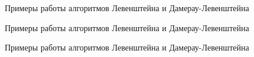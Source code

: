\documentclass[a4paper]{article}
\begin{document}
		\begin{figure}[h]
		
		\caption{Примеры работы алгоритмов Левенштейна и Дамерау-Левенштейна \centering}
		\label{image5}
	\end{figure}
	\begin{figure}[h]
		
		\caption{Примеры работы алгоритмов Левенштейна и Дамерау-Левенштейна \centering}
		\label{image6}
	\end{figure}
	
	\begin{figure}[h]
		
		\caption{Примеры работы алгоритмов Левенштейна и Дамерау-Левенштейна \centering}
		\label{image7}
	\end{figure}
\end{document}
